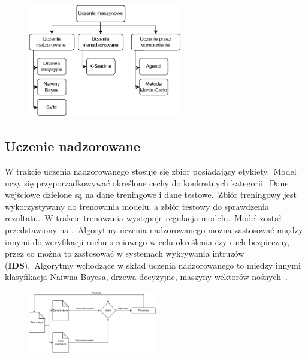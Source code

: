 \begin{figure}[H]
    \centering
    \includegraphics[width=0.6\textwidth]{images/ml-przyklady}
    \label{fig:ml-schema}
\end{figure}


\subsection{Uczenie nadzorowane}
W trakcie uczenia nadzorowanego stosuje się zbiór posiadający etykiety.\ Model uczy się przyporządkowywać określone cechy do konkretnych kategorii.\ Dane wejściowe dzielone są na dane treningowe i dane testowe.\ Zbiór treningowy jest wykorzystywany do trenowania modelu, a zbiór testowy do sprawdzenia rezultatu.\ W trakcie trenowania występuje regulacja modelu.\ Model został przedstawiony na .\ Algorytmy uczenia nadzorowanego można zastosować między innymi do weryfikacji ruchu sieciowego w celu określenia czy ruch bezpieczny, przez co można to zastosować w systemach wykrywania intruzów  (\textbf{IDS}).\ Algorytmy wchodzące w skład uczenia nadzorowanego to między innymi klasyfikacja Naiwna Bayesa, drzewa decyzyjne, maszyny wektorów nośnych~\cite{AiScience, Mahesh2018}.

\begin{figure}[H]
    \centering
    \includegraphics[width=0.5\textwidth]{images/supervised}
    \label{fig:spervised}
\end{figure}


